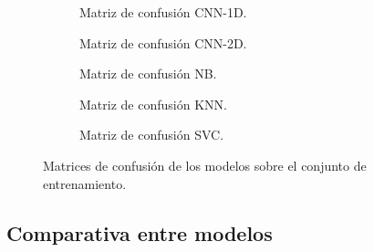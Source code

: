     \begin{figure}
        \centering
        \begin{subfigure}[b]{0.4\textwidth}
            \centering
            
            \caption{Matriz de confusión CNN-1D.}
            \label{ConfusionMatrixTrainImages:1D}
        \end{subfigure}
        \begin{subfigure}[b]{0.4\textwidth}
            \centering
            
            \caption{Matriz de confusión CNN-2D.} 
            \label{ConfusionMatrixTrainImages:2D}

        \end{subfigure}
        \begin{subfigure}[b]{0.4\textwidth}
            \centering
            
            \caption{Matriz de confusión NB.}
            \label{ConfusionMatrixTrainImages:NB}
        \end{subfigure}

        \begin{subfigure}[b]{0.4\textwidth}
            \centering
            
            \caption{Matriz de confusión KNN.}
            \label{ConfusionMatrixTrainImages:KNN}
        \end{subfigure}

        \begin{subfigure}[b]{0.4\textwidth}
            \centering
            
            \caption{Matriz de confusión SVC.}
            \label{ConfusionMatrixTrainImages:SVC}
        \end{subfigure}

        \caption{Matrices de confusión de los modelos sobre el conjunto de entrenamiento.}
        \label{ConfusionMatrixTrainImages}
     \end{figure}

  \subsection{Comparativa entre modelos}

